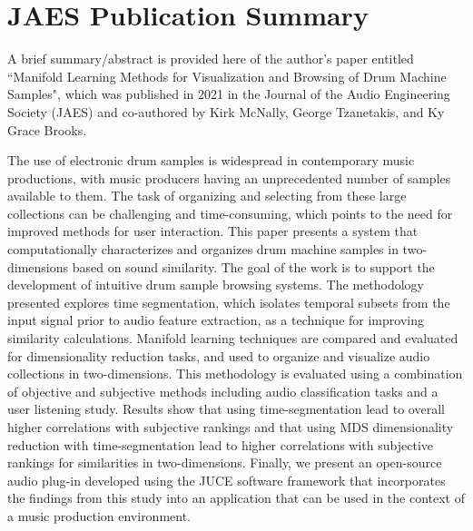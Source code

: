 \chapter{JAES Publication Summary}
\label{appendix:manifold}

A brief summary/abstract is provided here of the author's paper entitled ``Manifold Learning Methods for Visualization and Browsing of Drum Machine Samples", which was published in 2021 in the Journal of the Audio Engineering Society (JAES) \cite{shier2021manifold} and co-authored by Kirk McNally, George Tzanetakis, and Ky Grace Brooks.

The use of electronic drum samples is widespread in contemporary music productions, with music producers having an unprecedented number of samples available to them. The task of organizing and selecting from these large collections can be challenging and time-consuming, which points to the need for improved methods for user interaction. This paper presents a system that computationally characterizes and organizes drum machine samples in two-dimensions based on sound similarity. The goal of the work is to support the development of intuitive drum sample browsing systems. The methodology presented explores time segmentation, which isolates temporal subsets from the input signal prior to audio feature extraction, as a technique for improving similarity calculations. Manifold learning techniques are compared and evaluated for dimensionality reduction tasks, and used to organize and visualize audio collections in two-dimensions. This methodology is evaluated using a combination of objective and subjective methods including audio classification tasks and a user listening study. Results show that using time-segmentation lead to overall higher correlations with subjective rankings and that using MDS dimensionality reduction with time-segmentation lead to higher correlations with subjective rankings for similarities in two-dimensions. Finally, we present an open-source audio plug-in developed using the JUCE software framework that incorporates the findings from this study into an application that can be used in the context of a music production environment.